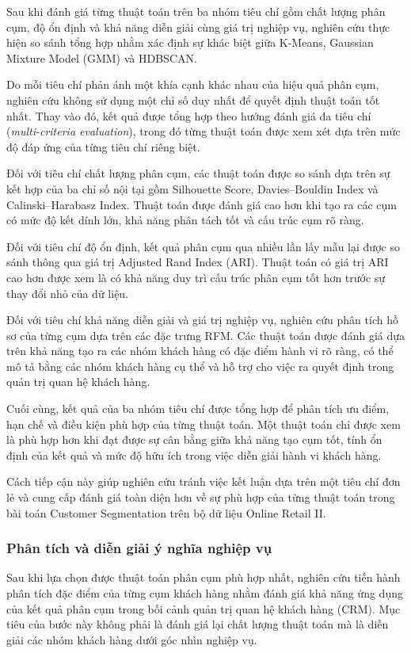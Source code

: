 \documentclass[12pt]{ai_conquer2026}
\begin{document}
Sau khi đánh giá từng thuật toán trên ba nhóm tiêu chí gồm chất lượng phân cụm, độ ổn định và khả năng diễn giải cùng giá trị nghiệp vụ, nghiên cứu thực hiện so sánh tổng hợp nhằm xác định sự khác biệt giữa K-Means, Gaussian Mixture Model (GMM) và HDBSCAN.

Do mỗi tiêu chí phản ánh một khía cạnh khác nhau của hiệu quả phân cụm, nghiên cứu không sử dụng một chỉ số duy nhất để quyết định thuật toán tốt nhất. Thay vào đó, kết quả được tổng hợp theo hướng đánh giá đa tiêu chí (\textit{multi-criteria evaluation}), trong đó từng thuật toán được xem xét dựa trên mức độ đáp ứng của từng tiêu chí riêng biệt.

Đối với tiêu chí chất lượng phân cụm, các thuật toán được so sánh dựa trên sự kết hợp của ba chỉ số nội tại gồm Silhouette Score, Davies--Bouldin Index và Calinski--Harabasz Index. Thuật toán được đánh giá cao hơn khi tạo ra các cụm có mức độ kết dính lớn, khả năng phân tách tốt và cấu trúc cụm rõ ràng.

Đối với tiêu chí độ ổn định, kết quả phân cụm qua nhiều lần lấy mẫu lại được so sánh thông qua giá trị Adjusted Rand Index (ARI). Thuật toán có giá trị ARI cao hơn được xem là có khả năng duy trì cấu trúc phân cụm tốt hơn trước sự thay đổi nhỏ của dữ liệu.

Đối với tiêu chí khả năng diễn giải và giá trị nghiệp vụ, nghiên cứu phân tích hồ sơ của từng cụm dựa trên các đặc trưng RFM. Các thuật toán được đánh giá dựa trên khả năng tạo ra các nhóm khách hàng có đặc điểm hành vi rõ ràng, có thể mô tả bằng các nhóm khách hàng cụ thể và hỗ trợ cho việc ra quyết định trong quản trị quan hệ khách hàng.

Cuối cùng, kết quả của ba nhóm tiêu chí được tổng hợp để phân tích ưu điểm, hạn chế và điều kiện phù hợp của từng thuật toán. Một thuật toán chỉ được xem là phù hợp hơn khi đạt được sự cân bằng giữa khả năng tạo cụm tốt, tính ổn định của kết quả và mức độ hữu ích trong việc diễn giải hành vi khách hàng.

Cách tiếp cận này giúp nghiên cứu tránh việc kết luận dựa trên một tiêu chí đơn lẻ và cung cấp đánh giá toàn diện hơn về sự phù hợp của từng thuật toán trong bài toán Customer Segmentation trên bộ dữ liệu Online Retail II.

\subsubsection{Phân tích và diễn giải ý nghĩa nghiệp vụ}

Sau khi lựa chọn được thuật toán phân cụm phù hợp nhất, nghiên cứu tiến hành phân tích đặc điểm của từng cụm khách hàng nhằm đánh giá khả năng ứng dụng của kết quả phân cụm trong bối cảnh quản trị quan hệ khách hàng (CRM). Mục tiêu của bước này không phải là đánh giá lại chất lượng thuật toán mà là diễn giải các nhóm khách hàng dưới góc nhìn nghiệp vụ.
\end{document}

